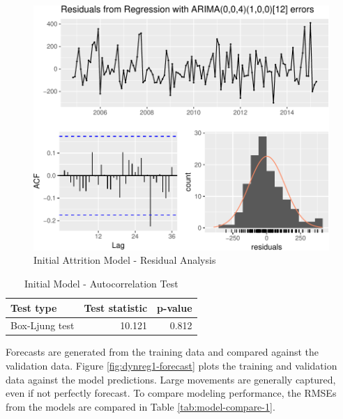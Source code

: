 \documentclass[12pt,letterpaper,toc=flat,oneside]{report}
\theoremstyle{definition}
\theoremstyle{definition}
\theoremstyle{definition}
\theoremstyle{remark}
\begin{document}
\begin{figure}[H]

{\centering \includegraphics{elliott-econometric-personnel-retention-18_files/figure-latex/dynreg1-resid-1} 

}

\caption{Initial Attrition Model - Residual Analysis}\label{fig:dynreg1-resid}
\end{figure}

\begin{table}[!h]

\caption{\label{tab:dynreg1-boxtest}Initial Model - Autocorrelation Test}
\centering
\begin{tabular}[t]{lrr}
\toprule
\bfseries{Test type} & \bfseries{Test statistic} & \bfseries{p-value}\\
\midrule
Box-Ljung test & 10.121 & 0.812\\
\bottomrule
\end{tabular}
\end{table}

Forecasts are generated from the training data and compared against the
validation data. Figure \ref{fig:dynreg1-forecast} plots the training
and validation data against the model predictions. Large movements are
generally captured, even if not perfectly forecast. To compare modeling
performance, the RMSEs from the models are compared in Table
\ref{tab:model-compare-1}.
\end{document}
